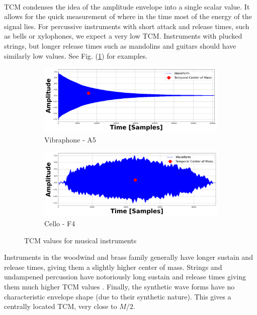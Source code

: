 \documentclass[12pt,letterpaper]{article}
\begin{document}
\paragraph*{}TCM condenses the idea of the amplitude envelope into a single scalar value. It allows for the quick measurement of where in the time most of the energy of the signal lies. For percussive instruments with short attack and release times, such as bells or xylophones, we expect a very low TCM. Instruments with plucked strings, but longer release times such as mandolins and guitars should have similarly low values. See Fig. (\ref{fig-ExampleTCM}) for examples.
\begin{figure}[H]
	\begin{subfigure}[b]{0.45\textwidth}
	\begin{center}
	\includegraphics[width=1.0\linewidth]{../FiguresSpectrogram/Vibraphone-sustain-A5-R_TCM}
	\caption{Vibraphone - A5}
	\end{center}
	\end{subfigure}	
	\hfill
	\begin{subfigure}[b]{0.45\textwidth}
	\begin{center}
	\includegraphics[width=1.0\linewidth]{../FiguresSpectrogram/CELLO-F4_TCM}
	\caption{Cello - F4}
	\end{center}
	\end{subfigure}
	\caption{TCM values for musical instruments}
	\label{fig-ExampleTCM}
\end{figure}
Instruments in the woodwind and brass family generally have longer sustain and release times, giving them a slightly higher center of mass. Strings and undampened percussion have notoriously long sustain and release times giving them much higher TCM values \cite{Olson,White}. Finally, the synthetic wave forms have no characteristic  envelope shape (due to their synthetic nature). This gives a centrally located TCM, very close to $M/2$.
\end{document}
